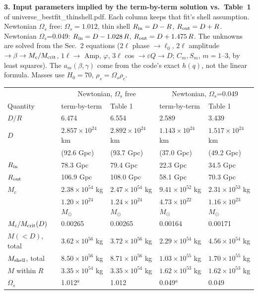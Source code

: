 \documentclass[10pt]{article}
\begin{document}
{\textbf{3. Input parameters implied by the term-by-term solution vs.\ Table~1} of universe\_bestfit\_thinshell.pdf. Each column keeps that fit's shell assumption. Newtonian $\Omega_s$ free: $\Omega_s=1.012$, thin shell $R_{\rm in}=D-R$, $R_{\rm out}=D+R$. Newtonian $\Omega_s$=0.049: $R_{\rm in}=D-1.028\,R$, $R_{\rm out}=D+1.475\,R$. The unknowns are solved from the Sec.~2 equations ($2\ell$ phase $\to\ell_0$, $2\ell$ amplitude $\to\beta\to M_c/M_{\rm crit}$, $1\ell\to$ Amp, $\varphi$, $3\ell$ cos $\to\varepsilon Q\to D$; $C_m,S_m$, $m=1$--3, by least squares). The $a_m(\beta,\gamma)$ come from the code's exact $h(q)$, not the linear formula. Masses use $H_0=70$, $\rho_s=\Omega_s\rho_c$.
\begin{center}\footnotesize\setlength{\tabcolsep}{5pt}\begin{tabular}{lllll}\toprule
 & \multicolumn{2}{c}{Newtonian, $\Omega_s$ free} & \multicolumn{2}{c}{Newtonian, $\Omega_s$=0.049}\\
Quantity & term-by-term & Table 1 & term-by-term & Table 1\\\midrule
$D/R$ & 6.474 & 6.554 & 2.589 & 3.439\\
$D$ & $2.857{\times}10^{24}$ km & $2.892{\times}10^{24}$ km & $1.143{\times}10^{24}$ km & $1.517{\times}10^{24}$ km\\
 & (92.6 Gpc) & (93.7 Gpc) & (37.0 Gpc) & (49.2 Gpc)\\
$R_{\rm in}$ & 78.3 Gpc & 79.4 Gpc & 22.3 Gpc & 34.5 Gpc\\
$R_{\rm out}$ & 106.9 Gpc & 108.0 Gpc & 58.1 Gpc & 70.3 Gpc\\
$M_c$ & $2.38{\times}10^{54}$ kg & $2.47{\times}10^{54}$ kg & $9.41{\times}10^{52}$ kg & $2.31{\times}10^{53}$ kg\\
 & $1.20{\times}10^{24}$ $M_\odot$ & $1.24{\times}10^{24}$ $M_\odot$ & $4.73{\times}10^{22}$ $M_\odot$ & $1.16{\times}10^{23}$ $M_\odot$\\
$M_c/M_{\rm crit}(D)$ & 0.00265 & 0.00265 & 0.00164 & 0.00171\\
$M(<D)$, total & $3.62{\times}10^{56}$ kg & $3.72{\times}10^{56}$ kg & $2.29{\times}10^{54}$ kg & $4.56{\times}10^{54}$ kg\\
$M_{\rm shell}$, total & $8.50{\times}10^{56}$ kg & $8.71{\times}10^{56}$ kg & $1.03{\times}10^{55}$ kg & $1.70{\times}10^{55}$ kg\\
$M$ within $R$ & $3.35{\times}10^{54}$ kg & $3.35{\times}10^{54}$ kg & $1.62{\times}10^{53}$ kg & $1.62{\times}10^{53}$ kg\\
$\Omega_s$ & 1.012$^a$ & 1.012 & 0.049$^a$ & 0.049\\

\end{tabular}
\end{center}}
\end{document}
